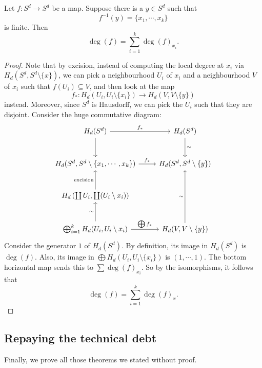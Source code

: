 \documentclass[a4paper]{article}
\theoremstyle{definition}
\begin{document}
\begin{thm}
  Let $f: S^d \to S^d$ be a map. Suppose there is a $y \in S^d$ such that
  \[
    f^{-1}(y) = \{x_1, \cdots, x_k\}
  \]
  is finite. Then
  \[
    \deg (f) = \sum_{i = 1}^k \deg(f)_{x_i}.
  \]
\end{thm}

\begin{proof}
  Note that by excision, instead of computing the local degree at $x_i$ via $H_d(S^d, S^d \setminus \{x\})$, we can pick a neighbourhood $U_i$ of $x_i$ and a neighbourhood $V$ of $x_i$ such that $f(U_i) \subseteq V$, and then look at the map
  \[
    f_*: H_d(U_i, U_i \setminus \{x_i\}) \to H_d(V, V \setminus \{y\})
  \]
  instead. Moreover, since $S^d$ is Hausdorff, we can pick the $U_i$ such that they are disjoint. Consider the huge commutative diagram:
  \[
    \begin{tikzcd}[row sep=large]
      H_d(S^d) \ar[r, "f_*"] \ar[d] & H_d(S^d) \ar[d, "\sim"]\\
      H_d(S^d, S^d \setminus \{x_1, \cdots, x_k\}) \ar[r, "f_*"] & H_d(S^d, S^d \setminus \{y\})\\
      H_d\left(\coprod U_i, \coprod (U_i \setminus x_i)\right) \ar[u, "\text{excision}"]\\
      \bigoplus_{i = 1}^ k H_d(U_i, U_i \setminus x_i) \ar[r, "\bigoplus f_*"] \ar[u, "\sim"] & H_d(V, V\setminus \{y\}) \ar[uu, "\sim"]
    \end{tikzcd}
  \]
  Consider the generator $1$ of $H_d(S^d)$. By definition, its image in $H_d(S^d)$ is $\deg(f)$. Also, its image in $\bigoplus H_d(U_i, U_i \setminus \{x_i\})$ is $(1, \cdots, 1)$. The bottom horizontal map sends this to $\sum \deg(f)_{x_i}$. So by the isomorphisms, it follows that
  \[
    \deg(f) = \sum_{i = 1}^k \deg(f)_x.
  \]
\end{proof}
\subsection{Repaying the technical debt}
Finally, we prove all those theorems we stated without proof.
\end{document}
